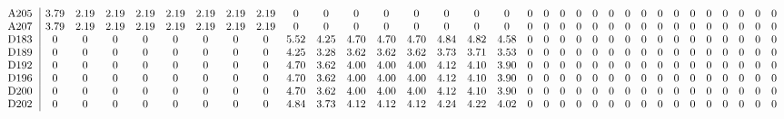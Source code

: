 \begin{table}[H]
\begin{center}
\begin{math}
\begin{array}{c|cccccccccccccccccccccccccccccccc}
\mathrm{A205} \hspace*{2pt} &       3.79 &       2.19 &       2.19 &       2.19 &       2.19 &       2.19 &       2.19 &       2.19 &  0 &  0 &  0 &  0 &  0 &  0 &  0 &  0 &  0 &  0 &  0 &  0 &  0 &  0 &  0 &  0 &  0 &  0 &  0 &  0 &  0 &  0 &  0 &  0 \\
\mathrm{A207} \hspace*{2pt} &       3.79 &       2.19 &       2.19 &       2.19 &       2.19 &       2.19 &       2.19 &       2.19 &  0 &  0 &  0 &  0 &  0 &  0 &  0 &  0 &  0 &  0 &  0 &  0 &  0 &  0 &  0 &  0 &  0 &  0 &  0 &  0 &  0 &  0 &  0 &  0 \\
\mathrm{D183} \hspace*{2pt} &  0 &  0 &  0 &  0 &  0 &  0 &  0 &  0 &       5.52 &       4.25 &       4.70 &       4.70 &       4.70 &       4.84 &       4.82 &       4.58 &  0 &  0 &  0 &  0 &  0 &  0 &  0 &  0 &  0 &  0 &  0 &  0 &  0 &  0 &  0 &  0 \\
\mathrm{D189} \hspace*{2pt} &  0 &  0 &  0 &  0 &  0 &  0 &  0 &  0 &       4.25 &       3.28 &       3.62 &       3.62 &       3.62 &       3.73 &       3.71 &       3.53 &  0 &  0 &  0 &  0 &  0 &  0 &  0 &  0 &  0 &  0 &  0 &  0 &  0 &  0 &  0 &  0 \\
\mathrm{D192} \hspace*{2pt} &  0 &  0 &  0 &  0 &  0 &  0 &  0 &  0 &       4.70 &       3.62 &       4.00 &       4.00 &       4.00 &       4.12 &       4.10 &       3.90 &  0 &  0 &  0 &  0 &  0 &  0 &  0 &  0 &  0 &  0 &  0 &  0 &  0 &  0 &  0 &  0 \\
\mathrm{D196} \hspace*{2pt} &  0 &  0 &  0 &  0 &  0 &  0 &  0 &  0 &       4.70 &       3.62 &       4.00 &       4.00 &       4.00 &       4.12 &       4.10 &       3.90 &  0 &  0 &  0 &  0 &  0 &  0 &  0 &  0 &  0 &  0 &  0 &  0 &  0 &  0 &  0 &  0 \\
\mathrm{D200} \hspace*{2pt} &  0 &  0 &  0 &  0 &  0 &  0 &  0 &  0 &       4.70 &       3.62 &       4.00 &       4.00 &       4.00 &       4.12 &       4.10 &       3.90 &  0 &  0 &  0 &  0 &  0 &  0 &  0 &  0 &  0 &  0 &  0 &  0 &  0 &  0 &  0 &  0 \\
\mathrm{D202} \hspace*{2pt} &  0 &  0 &  0 &  0 &  0 &  0 &  0 &  0 &       4.84 &       3.73 &       4.12 &       4.12 &       4.12 &       4.24 &       4.22 &       4.02 &  0 &  0 &  0 &  0 &  0 &  0 &  0 &  0 &  0 &  0 &  0 &  0 &  0 &  0 &  0 &  0 \\

\end{array}
\end{math}
\end{center}
\end{table}
